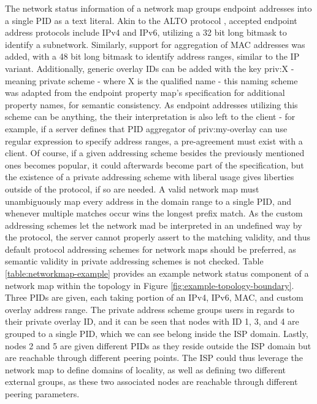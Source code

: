     The network status information of a network map groups endpoint addresses into a single PID as a text literal.
    Akin to the ALTO protocol \cite{alto-protocol}, accepted endpoint address protocols include IPv4 and IPv6, utilizing a 32 bit long bitmask to identify a subnetwork.
    Similarly, support for aggregation of MAC addresses was added, with a 48 bit long bitmask to identify address ranges, similar to the IP variant.
    Additionally, generic overlay IDs can be added with the key priv:X - meaning private scheme - where X is the qualified name - this naming scheme was adapted from the endpoint property map's specification for additional property names, for semantic consistency.
    As endpoint addresses utilizing this scheme can be anything, the their interpretation is also left to the client - for example, if a server defines that PID aggregator of priv:my-overlay can use regular expression to specify address ranges, a pre-agreement must exist with a client.
    Of course, if a given addressing scheme besides the previously mentioned ones becomes popular, it could afterwards become part of the specification, but the existence of a private addressing scheme with liberal usage gives liberties outside of the protocol, if so are needed.
    A valid network map must unambiguously map every address in the domain range to a single PID, and whenever multiple matches occur wins the longest prefix match.
    As the custom addressing schemes let the network mad be interpreted in an undefined way by the protocol, the server cannot properly assert to the matching validity, and thus default protocol addressing schemes for network maps should be preferred, as semantic validity in private addressing schemes is not checked.
    Table \ref{table:networkmap-example} provides an example network status component of a network map within the topology in Figure \ref{fig:example-topology-boundary}.
    Three PIDs are given, each taking portion of an IPv4, IPv6, MAC, and custom overlay address range.
    The private address scheme groups users in regards to their private overlay ID, and it can be seen that nodes with ID 1, 3, and 4 are grouped to a single PID, which we can see belong inside the ISP domain.
    Lastly, nodes 2 and 5 are given different PIDs as they reside outside the ISP domain but are reachable through different peering points.
    The ISP could thus leverage the network map to define domains of locality, as well as defining two different external groups, as these two associated nodes are reachable through different peering parameters.

